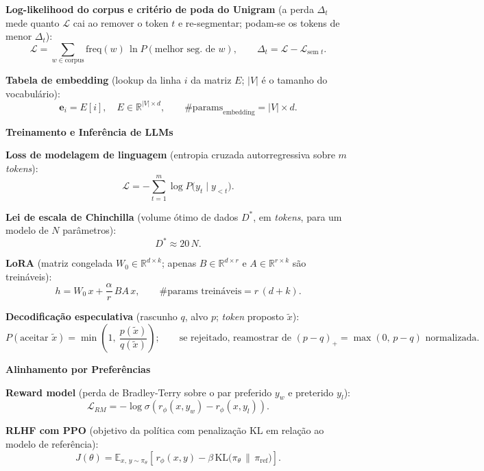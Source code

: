 \documentclass[11pt,a4paper]{article}
\newcommand{\bloco}[1]{%
  \par\vspace{0.3em}%
  {\bfseries\large #1}\par%
  \vspace{-0.4em}{\color{gray!60}\rule{\linewidth}{0.4pt}}\par%
}
\begin{document}
\textbf{Log-likelihood do corpus e critério de poda do Unigram} (a perda $\Delta_t$ mede quanto $\mathcal{L}$ cai ao remover o token $t$ e re-segmentar; podam-se os tokens de menor $\Delta_t$):
\[
  \mathcal{L} = \sum_{w \in \text{corpus}} \mathrm{freq}(w)\,\ln P(\text{melhor seg.\ de } w),
  \qquad
  \Delta_t = \mathcal{L} - \mathcal{L}_{\text{sem } t}.
\]

\textbf{Tabela de embedding} (lookup da linha $i$ da matriz $E$; $|V|$ é o tamanho do vocabulário):
\[
  \mathbf{e}_i = E[i], \quad E \in \mathbb{R}^{|V| \times d},
  \qquad
  \#\text{params}_{\text{embedding}} = |V| \times d.
\]

\bloco{Treinamento e Inferência de LLMs}

\textbf{Loss de modelagem de linguagem} (entropia cruzada autorregressiva sobre $m$ \textit{tokens}):
\[
  \mathcal{L} = -\sum_{t=1}^{m} \log P\bigl(y_t \mid y_{<t}\bigr).
\]

\textbf{Lei de escala de Chinchilla} (volume ótimo de dados $D^{*}$, em \textit{tokens}, para um modelo de $N$ parâmetros):
\[
  D^{*} \approx 20\,N.
\]

\textbf{LoRA} (matriz congelada $W_0 \in \mathbb{R}^{d \times k}$; apenas $B \in \mathbb{R}^{d \times r}$ e $A \in \mathbb{R}^{r \times k}$ são treináveis):
\[
  h = W_0\,x + \frac{\alpha}{r}\,B A\,x,
  \qquad
  \#\text{params treináveis} = r\,(d + k).
\]

\textbf{Decodificação especulativa} (rascunho $q$, alvo $p$; \textit{token} proposto $\tilde{x}$):
\[
  P(\text{aceitar } \tilde{x}) = \min\!\left(1,\ \frac{p(\tilde{x})}{q(\tilde{x})}\right);
  \qquad
  \text{se rejeitado, reamostrar de } (p - q)_{+} = \max(0,\, p - q) \text{ normalizada}.
\]

\bloco{Alinhamento por Preferências}

\textbf{Reward model} (perda de Bradley-Terry sobre o par preferido $y_w$ e preterido $y_l$):
\[
  \mathcal{L}_{RM} = -\log \sigma\!\left(r_\phi(x, y_w) - r_\phi(x, y_l)\right).
\]

\textbf{RLHF com PPO} (objetivo da política com penalização KL em relação ao modelo de referência):
\[
  J(\theta) = \mathbb{E}_{x,\,y \sim \pi_\theta}\!\left[\, r_\phi(x, y) - \beta\,\mathrm{KL}\bigl(\pi_\theta \,\|\, \pi_{\text{ref}}\bigr) \right].
\]
\end{document}
